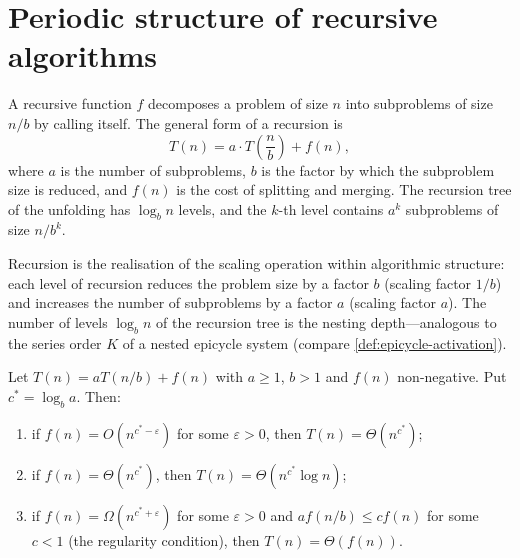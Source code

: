 \section{Periodic structure of recursive algorithms}

\begin{definition}\label{def:recursion}
A recursive function $f$ decomposes a problem of size $n$ into subproblems of size $n/b$ by calling itself. The general form of a recursion is
\[
T(n) = a \cdot T\left(\frac{n}{b}\right) + f(n),
\]
where $a$ is the number of subproblems, $b$ is the factor by which the subproblem size is reduced, and $f(n)$ is the cost of splitting and merging. The recursion tree of the unfolding has $\log_b n$ levels, and the $k$-th level contains $a^k$ subproblems of size $n/b^k$.

Recursion is the realisation of the scaling operation within algorithmic structure: each level of recursion reduces the problem size by a factor $b$ (scaling factor $1/b$) and increases the number of subproblems by a factor $a$ (scaling factor $a$). The number of levels $\log_b n$ of the recursion tree is the nesting depth---analogous to the series order $K$ of a nested epicycle system (compare \cref{def:epicycle-activation}).
\end{definition}

\begin{theorem}\label{thm:master_theorem}
Let $T(n) = a T(n/b) + f(n)$ with $a \ge 1$, $b > 1$ and $f(n)$ non-negative. Put $c^* = \log_b a$. Then:
\begin{enumerate}[label=(\roman*)]
    \item if $f(n) = O(n^{c^*-\varepsilon})$ for some $\varepsilon > 0$, then $T(n) = \Theta(n^{c^*})$;
    \item if $f(n) = \Theta(n^{c^*})$, then $T(n) = \Theta(n^{c^*} \log n)$;
    \item if $f(n) = \Omega(n^{c^*+\varepsilon})$ for some $\varepsilon > 0$ and $a f(n/b) \le c f(n)$ for some $c < 1$ (the regularity condition), then $T(n) = \Theta(f(n))$.
\end{enumerate}
\end{theorem}

